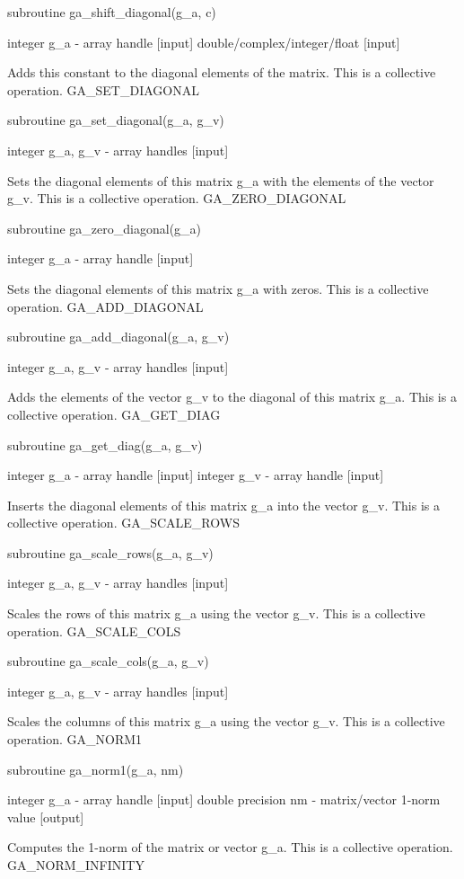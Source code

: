 subroutine ga\_shift\_diagonal(g\_a, c)

integer g\_a - array handle {[}input{]} double/complex/integer/float
{[}input{]}

Adds this constant to the diagonal elements of the matrix. This is
a collective operation. GA\_SET\_DIAGONAL

subroutine ga\_set\_diagonal(g\_a, g\_v)

integer g\_a, g\_v - array handles {[}input{]}

Sets the diagonal elements of this matrix g\_a with the elements of
the vector g\_v. This is a collective operation. GA\_ZERO\_DIAGONAL

subroutine ga\_zero\_diagonal(g\_a)

integer g\_a - array handle {[}input{]}

Sets the diagonal elements of this matrix g\_a with zeros. This is
a collective operation. GA\_ADD\_DIAGONAL

subroutine ga\_add\_diagonal(g\_a, g\_v)

integer g\_a, g\_v - array handles {[}input{]}

Adds the elements of the vector g\_v to the diagonal of this matrix
g\_a. This is a collective operation. GA\_GET\_DIAG

subroutine ga\_get\_diag(g\_a, g\_v)

integer g\_a - array handle {[}input{]} integer g\_v - array handle
{[}input{]}

Inserts the diagonal elements of this matrix g\_a into the vector
g\_v. This is a collective operation. GA\_SCALE\_ROWS

subroutine ga\_scale\_rows(g\_a, g\_v)

integer g\_a, g\_v - array handles {[}input{]}

Scales the rows of this matrix g\_a using the vector g\_v. This is
a collective operation. GA\_SCALE\_COLS

subroutine ga\_scale\_cols(g\_a, g\_v)

integer g\_a, g\_v - array handles {[}input{]}

Scales the columns of this matrix g\_a using the vector g\_v. This
is a collective operation. GA\_NORM1

subroutine ga\_norm1(g\_a, nm)

integer g\_a - array handle {[}input{]} double precision nm - matrix/vector
1-norm value {[}output{]}

Computes the 1-norm of the matrix or vector g\_a. This is a collective
operation. GA\_NORM\_INFINITY

